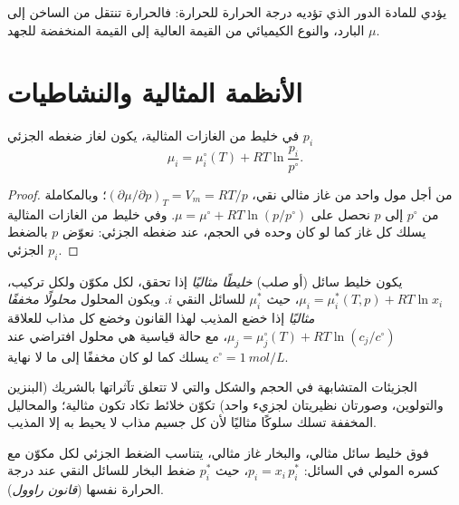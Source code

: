 يؤدي  للمادة الدور الذي تؤديه درجة الحرارة للحرارة: فالحرارة
تنتقل من الساخن إلى البارد، والنوع الكيميائي من القيمة العالية إلى القيمة المنخفضة للجهد $\mu$.

\section{الأنظمة المثالية والنشاطيات}

\begin{proposition}\label{prop:b2:chemical-potential:mu-gas}
في خليط من الغازات المثالية، يكون لغاز ضغطه الجزئي $p_i$
\[
  \mu_i = \mu_i^\circ(T) + RT\ln\frac{p_i}{p^\circ} .
\]
\end{proposition}

\begin{proof}
من أجل مول واحد من غاز مثالي نقي، $(\partial\mu/\partial p)_T = V_m =
RT/p$؛ وبالمكاملة من $p^\circ$ إلى $p$ نحصل على $\mu = \mu^\circ + RT\ln(p/p^\circ)$.
وفي خليط من الغازات المثالية يسلك كل غاز كما لو كان وحده في الحجم، عند
ضغطه الجزئي: نعوّض $p$ بالضغط الجزئي $p_i$.
\end{proof}

\begin{definition}\label{def:b2:chemical-potential:ideal-mixture}
يكون خليط سائل (أو صلب) \emph{خليطًا مثاليًا}
إذا تحقق، لكل مكوّن ولكل تركيب،
$\mu_i = \mu_i^*(T, p) + RT\ln x_i$، حيث $\mu_i^*$ 
للسائل النقي $i$. ويكون المحلول \emph{محلولًا مخففًا
مثاليًا} إذا خضع المذيب لهذا القانون وخضع كل
مذاب للعلاقة $\mu_j = \mu_j^\circ(T) + RT\ln(c_j/c^\circ)$، مع حالة قياسية
هي محلول افتراضي عند $c^\circ = \qty{1}{mol/L}$ يسلك
كما لو كان مخففًا إلى ما لا نهاية.
\end{definition}

الجزيئات المتشابهة في الحجم والشكل والتي لا تتعلق تآثراتها بالشريك
(البنزين والتولوين، وصورتان نظيريتان لجزيء واحد) تكوّن خلائط تكاد تكون
مثالية؛ والمحاليل المخففة تسلك سلوكًا مثاليًا لأن كل جسيم مذاب لا يحيط به
إلا المذيب.

\begin{theorem}\label{thm:b2:chemical-potential:raoult}
فوق خليط سائل مثالي، والبخار غاز مثالي، يتناسب الضغط الجزئي لكل مكوّن
مع كسره المولي في السائل: $p_i = x_i\,p_i^*$، حيث $p_i^*$ ضغط البخار
للسائل النقي عند درجة الحرارة نفسها (\emph{قانون راوول}).
\end{theorem}


